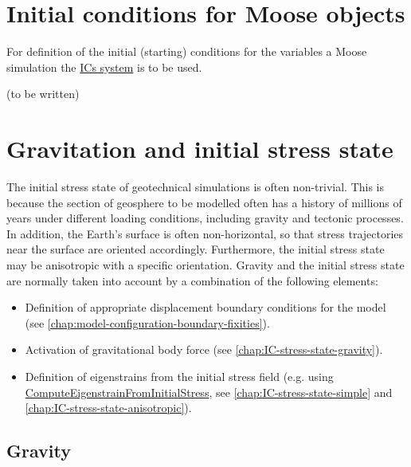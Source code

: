 \section{Initial conditions for Moose objects}
\label{chap:IC-moose-objects}

For definition of the initial (starting) conditions for the variables a Moose
simulation the \href{https://mooseframework.inl.gov/syntax/ICs}{ICs system} is
to be used.

(to be written)

\section{Gravitation and initial stress state}
\label{chap:IC-stress-state}

The initial stress state of geotechnical simulations is often non-trivial. This
is because the section of geosphere to be modelled often has a history of
millions of years under different loading conditions, including gravity and
tectonic processes. In addition, the Earth's surface is often non-horizontal,
so that stress trajectories near the surface are oriented accordingly.
Furthermore, the initial stress state may be anisotropic with a specific
orientation. Gravity and the initial stress state are normally taken into
account by a combination of the following elements:

\begin{itemize}
  \item Definition of appropriate displacement boundary conditions for the model (see
        \autoref{chap:model-configuration-boundary-fixities}).
  \item Activation of gravitational body force (see
        \autoref{chap:IC-stress-state-gravity}).
  \item Definition of eigenstrains from the initial stress field (e.g. using
        \href{https://mooseframework.inl.gov/source/materials/ComputeEigenstrainFromInitialStress.html}{ComputeEigenstrainFromInitialStress},
        see \autoref{chap:IC-stress-state-simple} and
        \autoref{chap:IC-stress-state-anisotropic}).
\end{itemize}


\subsection{Gravity}
\label{chap:IC-stress-state-gravity}

